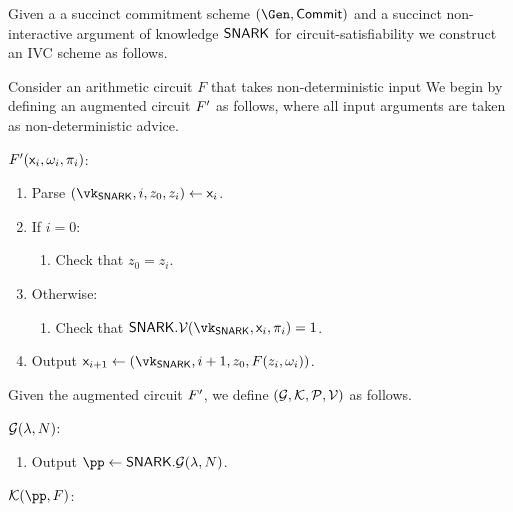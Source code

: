 \begin{construction}\label{cons:ivc}
   Given a 
   a succinct commitment scheme
   $(\Gen, \Commit)$
   and a
   succinct non-interactive argument of knowledge 
   $\mathsf{SNARK}$ for circuit-satisfiability
   we construct an IVC scheme as follows.
   
   Consider an arithmetic circuit $F$ 
   that takes non-deterministic input
   We begin by defining an augmented circuit
   $F'$
   as follows,
   where all input arguments are taken as non-deterministic advice.
   \begin{mdframed}[nobreak=true]
     \noindent \underline{$F'(\mathsf{x}_i, \omega_i, \pi_i)$}:
     \begin{enumerate}
       \item Parse $(\vk_\snark, i, z_0, z_i) \gets \io_i$.
       \item  If $i = 0$:
       \begin{enumerate}
         \item Check that $z_0 = z_i$.
         \label{ivc:fp:base}
       \end{enumerate}
       \item Otherwise:
       \begin{enumerate} 
         \item Check that $\snark.\V(\vk_\snark, \io_i, \pi_i) = 1$.
         \label{ivc:fp:check:general}
       \end{enumerate}
       \item Output $\io_{i + 1} \gets (\vk_{\snark}, i + 1, z_0, F(z_i, \omega_i))$.
       \label{ivc:fp:output}
     \end{enumerate}  
   \end{mdframed} 
   Given the augmented circuit $F'$,
   we define $(\mathcal{G}, \mathcal{K}, \mathcal{P}, \mathcal{V})$ as follows.
   \begin{mdframed}[nobreak=true]
     \underline{$\mathcal{G}(\lambda, N)$}:
     \begin{enumerate}
       \item Output $\pp \gets \snark.\mathcal{G}({\lambda}, N)$.
     \end{enumerate}
   \end{mdframed}
   \begin{mdframed}[nobreak=true]
     \underline{$\En(\pp, F)$}:
     \begin{enumerate}
       

\end{enumerate}
\end{mdframed}
\end{construction}
